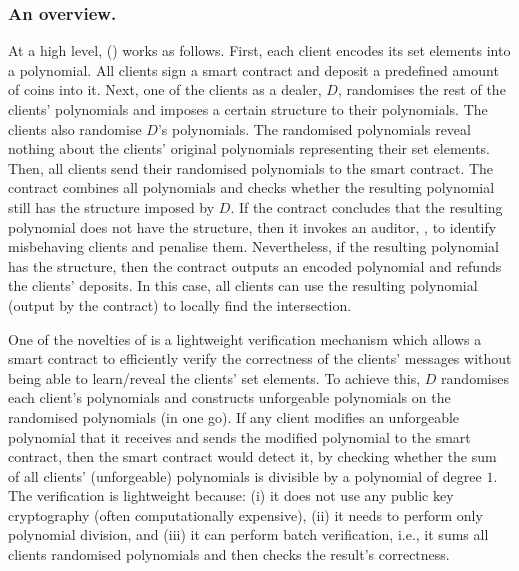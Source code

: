 \subsubsection{An overview.} At a high level, \withFai (\fpsi) works as follows. First, each client encodes its set elements into a polynomial. All clients sign a smart contract and deposit a predefined amount of coins into it.  Next,  one of the clients as a dealer, $D$, randomises the rest of the clients' polynomials and imposes a certain structure to their polynomials. The clients also randomise $D$'s polynomials. The randomised polynomials reveal nothing about the clients' original polynomials representing their set elements. Then, all clients send their randomised polynomials to the smart contract.  The contract combines all polynomials and checks whether the resulting polynomial still has the structure imposed by $D$. If the contract concludes that the resulting polynomial does not have the structure, then it invokes an auditor, \aud, to identify misbehaving clients and penalise them. Nevertheless, if the resulting polynomial has the structure, then the contract outputs an encoded polynomial and refunds the clients' deposits. In this case, all clients can use the resulting polynomial (output by the contract) to locally find the intersection. 







One of the novelties of \fpsi is a lightweight verification mechanism which allows a smart contract to efficiently verify the correctness of the clients' messages without being able to learn/reveal the clients' set elements. To achieve this, $D$ randomises each client's polynomials and constructs unforgeable polynomials on the randomised polynomials (in one go). If any client modifies an unforgeable polynomial that it receives and sends the modified polynomial to the smart contract,  then the smart contract would detect it, by checking whether the sum of all clients' (unforgeable) polynomials is divisible by a polynomial of degree $1$.  The verification is lightweight because: (i) it does not use any public key cryptography (often computationally expensive), (ii) it needs to perform only polynomial division, and (iii) it can perform batch verification, i.e., it sums all clients randomised polynomials and then checks the result's correctness.






